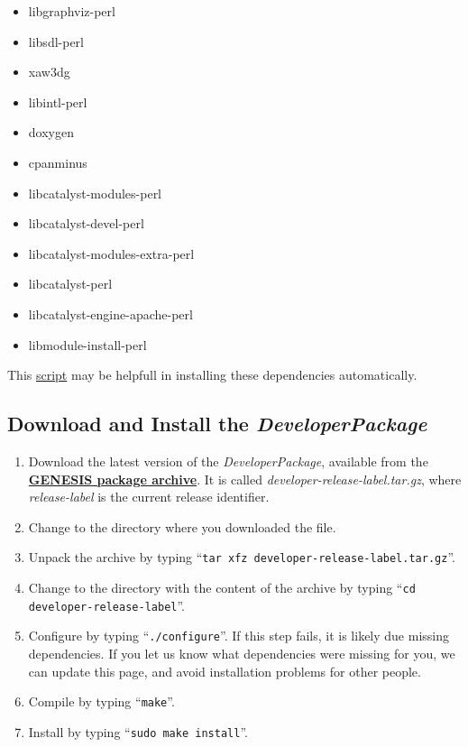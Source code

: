 \documentclass[12pt]{article}
\begin{document}
\begin{itemize}
\begin{itemize}
         \item libgraphviz-perl
         \item libsdl-perl
         \item xaw3dg
         \item libintl-perl
         \item doxygen
         \item cpanminus
         \item libcatalyst-modules-perl
         \item libcatalyst-devel-perl
         \item libcatalyst-modules-extra-perl
         \item libcatalyst-perl
         \item libcatalyst-engine-apache-perl
         \item libmodule-install-perl
      \end{itemize}
 \end{itemize}

This \href{scripts/install-dependencies.sh}{script} may be helpfull in installing these dependencies automatically.


\subsection*{Download and Install the {\it DeveloperPackage}}

\begin{enumerate}
   \item Download the latest version of the {\it DeveloperPackage}, available from the \href{http://repo-genesis3.cbi.utsa.edu/src/}{\bf GENESIS package archive}. It is called {\it developer-release-label.tar.gz}, where {\it release-label} is the current release identifier.
   \item Change to the directory where you downloaded the file.
   \item Unpack the archive by typing ``{\tt tar xfz developer-release-label.tar.gz}''.
   \item Change to the directory with the content of the archive by typing ``{\tt cd developer-release-label}''.
   \item Configure by typing ``{\tt ./configure}''.  If this step fails, it is likely due missing dependencies.  If you let us know what dependencies were missing for you, we can update this page, and avoid installation problems for other people.
   \item Compile by typing ``{\tt make}''.
   \item Install by typing ``{\tt sudo make install}''. 
\end{enumerate}
\end{document}

